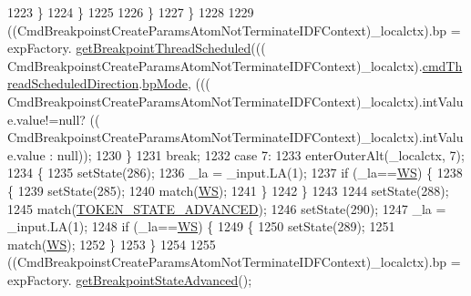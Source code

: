 \begin{DoxyCode}
1223             \}
1224           \}
1225 
1226           \}
1227         \}
1228 
1229          ((CmdBreakpoinstCreateParamsAtomNotTerminateIDFContext)\_localctx).bp =  expFactory.
      \hyperlink{classgov_1_1nasa_1_1jpf_1_1inspector_1_1server_1_1expression_1_1_expression_factory_a0513105481311bad2db8f17e8619bbd1}{getBreakpointThreadScheduled}(((
      CmdBreakpoinstCreateParamsAtomNotTerminateIDFContext)\_localctx).\hyperlink{classgov_1_1nasa_1_1jpf_1_1inspector_1_1server_1_1expression_1_1parser_1_1_expression_grammar_parser_aa1e14518e300b02c71f006c270cb4c41}{cmdThreadScheduledDirection}.\hyperlink{classgov_1_1nasa_1_1jpf_1_1inspector_1_1server_1_1expression_1_1parser_1_1_expression_grammar_pa3ae49d5d83c380526042a5aff91ee0a2_a6b918809e1604f546ba4cd87f491b1ec}{bpMode}, (((
      CmdBreakpoinstCreateParamsAtomNotTerminateIDFContext)\_localctx).intValue.value!=null? ((
      CmdBreakpoinstCreateParamsAtomNotTerminateIDFContext)\_localctx).intValue.value : null)); 
1230         \}
1231         \textcolor{keywordflow}{break};
1232       \textcolor{keywordflow}{case} 7:
1233         enterOuterAlt(\_localctx, 7);
1234         \{
1235         setState(286);
1236         \_la = \_input.LA(1);
1237         \textcolor{keywordflow}{if} (\_la==\hyperlink{classgov_1_1nasa_1_1jpf_1_1inspector_1_1server_1_1expression_1_1parser_1_1_expression_grammar_parser_ace44714ae633c7b14794cc5a24d9ebf3}{WS}) \{
1238           \{
1239           setState(285);
1240           match(\hyperlink{classgov_1_1nasa_1_1jpf_1_1inspector_1_1server_1_1expression_1_1parser_1_1_expression_grammar_parser_ace44714ae633c7b14794cc5a24d9ebf3}{WS});
1241           \}
1242         \}
1243 
1244         setState(288);
1245         match(\hyperlink{classgov_1_1nasa_1_1jpf_1_1inspector_1_1server_1_1expression_1_1parser_1_1_expression_grammar_parser_a108097811c29bbb98aad9334612a9440}{TOKEN\_STATE\_ADVANCED});
1246         setState(290);
1247         \_la = \_input.LA(1);
1248         \textcolor{keywordflow}{if} (\_la==\hyperlink{classgov_1_1nasa_1_1jpf_1_1inspector_1_1server_1_1expression_1_1parser_1_1_expression_grammar_parser_ace44714ae633c7b14794cc5a24d9ebf3}{WS}) \{
1249           \{
1250           setState(289);
1251           match(\hyperlink{classgov_1_1nasa_1_1jpf_1_1inspector_1_1server_1_1expression_1_1parser_1_1_expression_grammar_parser_ace44714ae633c7b14794cc5a24d9ebf3}{WS});
1252           \}
1253         \}
1254 
1255          ((CmdBreakpoinstCreateParamsAtomNotTerminateIDFContext)\_localctx).bp =  expFactory.
      \hyperlink{classgov_1_1nasa_1_1jpf_1_1inspector_1_1server_1_1expression_1_1_expression_factory_a2eb7a3d72702f8c446a5b64ac6e5ab3f}{getBreakpointStateAdvanced}(); 

\end{DoxyCode}
